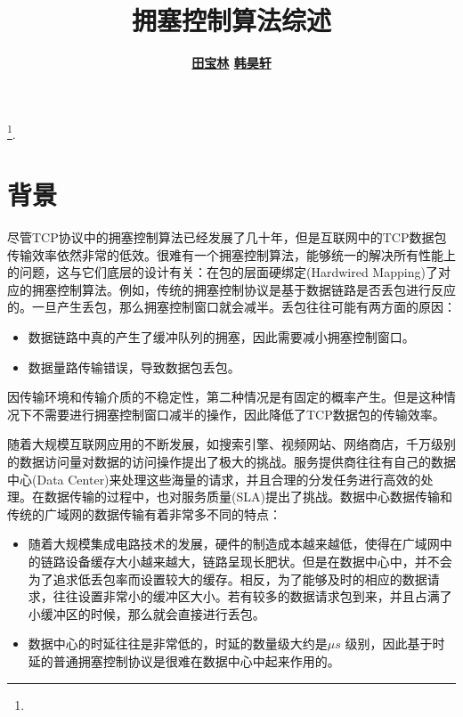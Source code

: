 \documentclass[a4paper, 12pt, UTF8]{ctexart}
\begin{document}
\title{\bf 拥塞控制算法综述} \author{
\bf \href{https://github.com/baolintian}{田宝林}\quad 
\bf \href{https://github.com/miracleXH}{韩昊轩}} 
\date{}

\maketitle
\tableofcontents
\footnote{\noindent {} \newline
  \updatetext{\today}}.

\clearpage


\section{背景}
\par 尽管TCP协议中的拥塞控制算法已经发展了几十年，但是互联网中的TCP数据包传输效率依然非常的低效。很难有一个拥塞控制算法，能够统一的解决所有性能上的问题，这与它们底层的设计有关：在包的层面硬绑定(Hardwired Mapping)\cite{DongMZAGGS18}了对应的拥塞控制算法。例如，传统的拥塞控制协议是基于数据链路是否丢包进行反应的。一旦产生丢包，那么拥塞控制窗口就会减半。丢包往往可能有两方面的原因\cite{DBLP:conf/imc/SundaresanADC17}：
\begin{itemize}
	\item 数据链路中真的产生了缓冲队列的拥塞，因此需要减小拥塞控制窗口。
	\item 数据量路传输错误，导致数据包丢包。
\end{itemize}

\par 因传输环境和传输介质的不稳定性，第二种情况是有固定的概率产生。但是这种情况下不需要进行拥塞控制窗口减半的操作，因此降低了TCP数据包的传输效率。

\par 随着大规模互联网应用的不断发展，如搜索引擎、视频网站、网络商店，千万级别的数据访问量对数据的访问操作提出了极大的挑战。服务提供商往往有自己的数据中心(Data Center)来处理这些海量的请求，并且合理的分发任务进行高效的处理。在数据传输的过程中，也对服务质量(SLA)提出了挑战。数据中心数据传输和传统的广域网的数据传输有着非常多不同的特点：
\begin{itemize}
	\item 随着大规模集成电路技术的发展，硬件的制造成本越来越低，使得在广域网中的链路设备缓存大小越来越大，链路呈现长肥状。但是在数据中心中，并不会为了追求低丢包率而设置较大的缓存。相反，为了能够及时的相应的数据请求，往往设置非常小的缓冲区大小。若有较多的数据请求包到来，并且占满了小缓冲区的时候，那么就会直接进行丢包。
	\item 数据中心的时延往往是非常低的，时延的数量级大约是$\mu s$ 级别，因此基于时延的普通拥塞控制协议是很难在数据中心中起来作用的\cite{DBLP:conf/sigcomm/ZakiPCSG15}。
\end{itemize}
\end{document}
